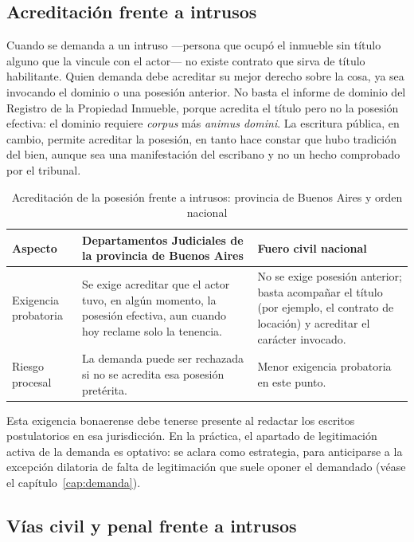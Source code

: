 \documentclass[12pt,oneside]{book}
\begin{document}
\subsection{Acreditación frente a intrusos}

Cuando se demanda a un intruso ---persona que ocupó el inmueble sin título alguno que la vincule con el actor--- no existe contrato que sirva de título habilitante. Quien demanda debe acreditar su mejor derecho sobre la cosa, ya sea invocando el dominio o una posesión anterior. No basta el informe de dominio del Registro de la Propiedad Inmueble, porque acredita el título pero no la posesión efectiva: el dominio requiere \textit{corpus} más \textit{animus domini}. La escritura pública, en cambio, permite acreditar la posesión, en tanto hace constar que hubo tradición del bien, aunque sea una manifestación del escribano y no un hecho comprobado por el tribunal.

\begin{table}[H]
\centering
\caption{Acreditación de la posesión frente a intrusos: provincia de Buenos Aires y orden nacional}
\begin{tabularx}{\textwidth}{>{\raggedright\arraybackslash}p{} X X}
\toprule
\textbf{Aspecto} & \textbf{Departamentos Judiciales de la provincia de Buenos Aires} & \textbf{Fuero civil nacional} \\
\midrule
Exigencia probatoria & Se exige acreditar que el actor tuvo, en algún momento, la posesión efectiva, aun cuando hoy reclame solo la tenencia. & No se exige posesión anterior; basta acompañar el título (por ejemplo, el contrato de locación) y acreditar el carácter invocado. \\
Riesgo procesal & La demanda puede ser rechazada si no se acredita esa posesión pretérita. & Menor exigencia probatoria en este punto. \\
\bottomrule
\end{tabularx}
\end{table}

Esta exigencia bonaerense debe tenerse presente al redactar los escritos postulatorios en esa jurisdicción. En la práctica, el apartado de legitimación activa de la demanda es optativo: se aclara como estrategia, para anticiparse a la excepción dilatoria de falta de legitimación que suele oponer el demandado (véase el capítulo~\ref{cap:demanda}).

\subsection{Vías civil y penal frente a intrusos}
\end{document}
